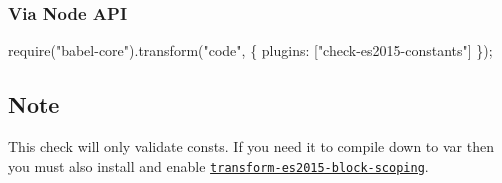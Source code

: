 \subsubsection*{Via Node A\+PI}


\begin{DoxyCode}
require("babel-core").transform("code", \{
  plugins: ["check-es2015-constants"]
\});
\end{DoxyCode}


\subsection*{Note}

This check will only validate consts. If you need it to compile down to {\ttfamily var} then you must also install and enable \href{http://babeljs.io/docs/plugins/transform-es2015-block-scoping/}{\tt {\ttfamily transform-\/es2015-\/block-\/scoping}}. 